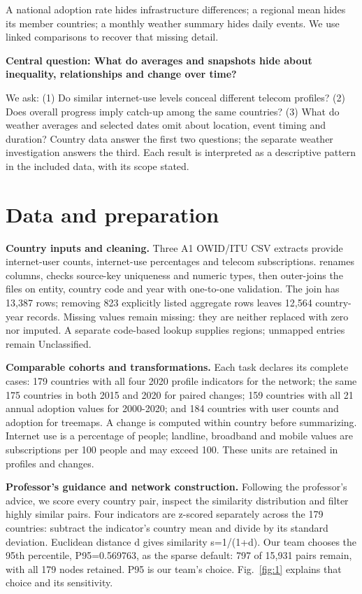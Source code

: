 \documentclass[conference,a4paper]{IEEEtran}
\begin{document}
A national adoption rate hides infrastructure differences; a regional mean hides its member countries; a monthly weather summary hides daily events. We use linked comparisons to recover that missing detail.

\textbf{Central question: What do averages and snapshots hide about inequality, relationships and change over time?}

We ask: (1) Do similar internet-use levels conceal different telecom profiles? (2) Does overall progress imply catch-up among the same countries? (3) What do weather averages and selected dates omit about location, event timing and duration? Country data answer the first two questions; the separate weather investigation answers the third. Each result is interpreted as a descriptive pattern in the included data, with its scope stated.



\section{Data and preparation}

\textbf{Country inputs and cleaning.} Three A1 OWID/ITU CSV extracts \cite{ref2} provide internet-user counts, internet-use percentages and telecom subscriptions.  renames columns, checks source-key uniqueness and numeric types, then outer-joins the files on entity, country code and year with one-to-one validation. The join has 13,387 rows; removing 823 explicitly listed aggregate rows leaves 12,564 country-year records. Missing values remain missing: they are neither replaced with zero nor imputed. A separate code-based lookup supplies regions; unmapped entries remain Unclassified.

\textbf{Comparable cohorts and transformations.} Each task declares its complete cases: 179 countries with all four 2020 profile indicators for the network; the same 175 countries in both 2015 and 2020 for paired changes; 159 countries with all 21 annual adoption values for 2000-2020; and 184 countries with user counts and adoption for treemaps. A change is computed within country before summarizing. Internet use is a percentage of people; landline, broadband and mobile values are subscriptions per 100 people and may exceed 100. These units are retained in profiles and changes.

\textbf{Professor's guidance and network construction.} Following the professor's advice, we score every country pair, inspect the similarity distribution and filter highly similar pairs. Four indicators are z-scored separately across the 179 countries: subtract the indicator's country mean and divide by its standard deviation. Euclidean distance d gives similarity s=1/(1+d). Our team chooses the 95th percentile, P95=0.569763, as the sparse default: 797 of 15,931 pairs remain, with all 179 nodes retained. P95 is our team's choice. Fig.~\ref{fig:1} explains that choice and its sensitivity.
\end{document}
